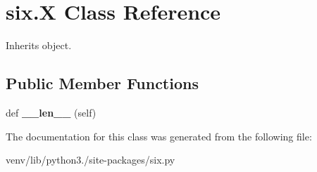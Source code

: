 \hypertarget{classsix_1_1_x}{}\section{six.\+X Class Reference}
\label{classsix_1_1_x}


Inherits object.

\subsection*{Public Member Functions}
\begin{DoxyCompactItemize}
\item 
\mbox{\label{classsix_1_1_x_a2a0c740ba10f5e755bc23009dc42dc3f}} 
def {\bfseries \+\_\+\+\_\+len\+\_\+\+\_\+} (self)
\end{DoxyCompactItemize}


The documentation for this class was generated from the following file\+:\begin{DoxyCompactItemize}
\item 
venv/lib/python3./site-\/packages/six.\+py\end{DoxyCompactItemize}
